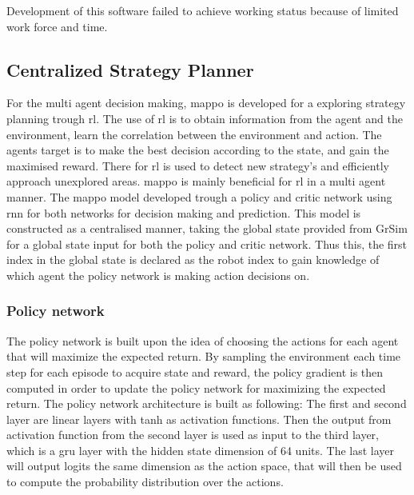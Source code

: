 Development of this software failed to achieve working status because of limited work force and time.


\subsection{Centralized Strategy Planner}
For the multi agent decision making, \ac{mappo} is developed for a exploring strategy planning trough \ac{rl}. The use of \ac{rl} is to obtain information from the agent and the environment, learn the correlation between the environment and action. The agents target is to make the best decision according to the state, and gain the maximised reward.
There for \ac{rl} is used to detect new strategy's and efficiently approach unexplored areas. \ac{mappo} is mainly beneficial for \ac{rl} in a multi agent manner. The \ac{mappo} model developed trough a policy and critic network using \ac{rnn} for both networks for decision making and prediction. This model is constructed as a centralised manner, taking the global state provided from GrSim for a global state input for both the policy and critic network. Thus this, the first index in the global state is declared as the robot index to gain knowledge of which agent the policy network is making action decisions on.

\subsubsection{Policy network}
The policy network is built upon the idea of choosing the actions for each agent that will maximize the expected return. By sampling the environment each time step for each episode to acquire state and reward, the policy gradient is then computed in order to update the policy network for maximizing the expected return. The policy network architecture is built as following: The first and second layer are linear layers with tanh as activation functions. Then the output from activation function from the second layer is used as input to the third layer, which is a \ac{gru} layer with the hidden state dimension of 64 units. The last layer will output logits the same dimension as the action space, that will then be used to compute the probability distribution over the actions.

